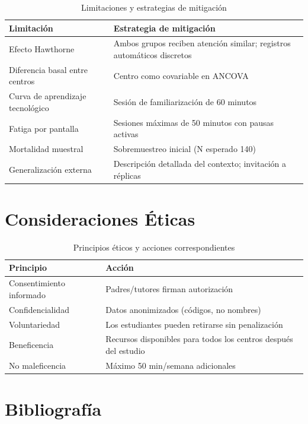 \documentclass[12pt,spanish]{article}
\begin{document}
\begin{table}[H]
\centering
\caption{Limitaciones y estrategias de mitigación}
\label{tab:limitaciones}
\begin{tabular}{|p{5cm}|p{8cm}|}
\hline
\textbf{Limitación} & \textbf{Estrategia de mitigación} \\
\hline
Efecto Hawthorne & Ambos grupos reciben atención similar; registros automáticos discretos \\
\hline
Diferencia basal entre centros & Centro como covariable en ANCOVA \\
\hline
Curva de aprendizaje tecnológico & Sesión de familiarización de 60 minutos \\
\hline
Fatiga por pantalla & Sesiones máximas de 50 minutos con pausas activas \\
\hline
Mortalidad muestral & Sobremuestreo inicial (N esperado 140) \\
\hline
Generalización externa & Descripción detallada del contexto; invitación a réplicas \\
\hline
\end{tabular}
\end{table}

\newpage
\section{Consideraciones Éticas}

\begin{table}[H]
\centering
\caption{Principios éticos y acciones correspondientes}
\label{tab:etica}
\begin{tabular}{|p{4cm}|p{9cm}|}
\hline
\textbf{Principio} & \textbf{Acción} \\
\hline
Consentimiento informado & Padres/tutores firman autorización \\
\hline
Confidencialidad & Datos anonimizados (códigos, no nombres) \\
\hline
Voluntariedad & Los estudiantes pueden retirarse sin penalización \\
\hline
Beneficencia & Recursos disponibles para todos los centros después del estudio \\
\hline
No maleficencia & Máximo 50 min/semana adicionales \\
\hline
\end{tabular}
\end{table}

\newpage
\section{Bibliografía}
\end{document}
